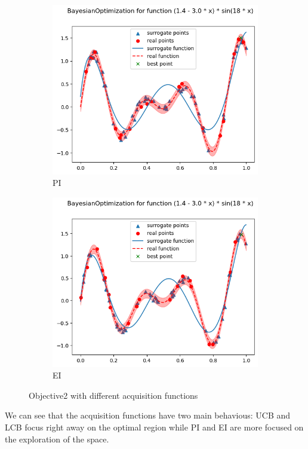 \begin{figure}[H]
\begin{subfigure}{0.5\textwidth}
        \includegraphics[width=\textwidth]{lab6/imgs/obj2_pi.png}
        \caption{PI}
    \end{subfigure}
    \begin{subfigure}{0.5\textwidth}
        \includegraphics[width=\textwidth]{lab6/imgs/obj2_ei.png}
        \caption{EI}
    \end{subfigure}
    \caption{Objective2 with different acquisition functions}
    \label{fig:bo-acquisition}
\end{figure}
We can see that the acquisition functions have two main behavious: UCB and LCB focus right away on the optimal region while PI and EI are more focused on the exploration of the space.

